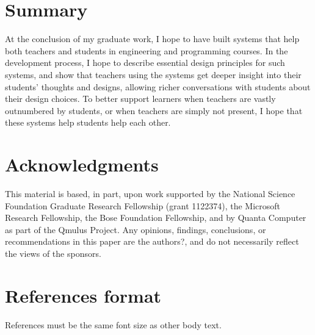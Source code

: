 \documentclass{sigchi}
\begin{document}
\section{Summary}
At the conclusion of my graduate work, I hope to have built systems that help both teachers and students in engineering and programming courses. In the development process, I hope to describe essential design principles for such systems, and show that teachers using the systems get deeper insight into their students' thoughts and designs, allowing richer conversations with students about their design choices. To better support learners when teachers are vastly outnumbered by students, or when teachers are simply not present, I hope that these systems help students help each other.








\section{Acknowledgments}

This material is based, in part, upon work supported by the National Science Foundation Graduate Research Fellowship (grant 1122374), the Microsoft Research Fellowship, the Bose Foundation Fellowship, and by Quanta Computer as part of the Qmulus Project.  Any opinions, findings, conclusions, or recommendations in this paper are the authors?, and do not necessarily reflect the views of the sponsors.

%
%
%
%
%
\balance

\section{References format}
References must be the same font size as other body text.



\end{document}

